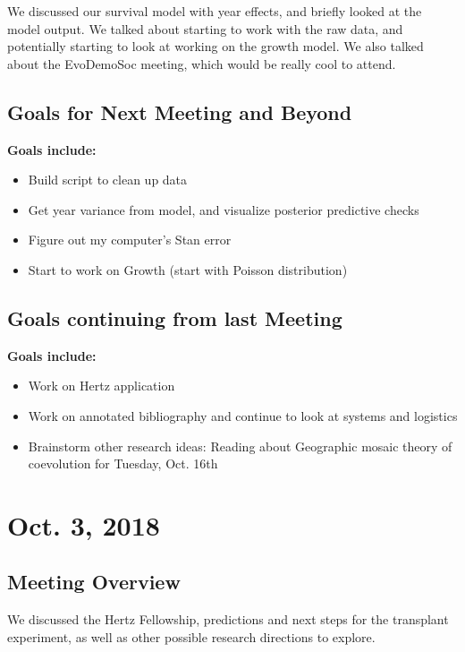 \documentclass{article}
\newcommand{\tom}[1]{{\textit{\color{WildStrawberry}{[#1]}}}}
\begin{document}
We discussed our survival model with year effects, and briefly looked at the model output. We talked about starting to work with the raw data, and potentially starting to look at working on the growth model. We also talked about the EvoDemoSoc meeting, which would be really cool to attend.

\subsection*{Goals for Next Meeting and Beyond}
\textbf{Goals include:} 
\begin{itemize}
\item{Build script to clean up data}
\item{Get year variance from model, and visualize posterior predictive checks}
\item{Figure out my computer's Stan error}
\item{Start to work on Growth (start with Poisson distribution) \tom{When you are ready for it, I can share an example of negative binomial growth modeling in Stan.}}
\end{itemize}

\subsection*{Goals continuing from last Meeting}
\textbf{Goals include:} 
\begin{itemize}
\item{Work on Hertz application}
\item{Work on annotated bibliography and continue to look at systems and logistics \tom{See comment on same point below}}
\item{Brainstorm other research ideas: Reading about Geographic mosaic theory of coevolution for Tuesday, Oct. 16th}
\end{itemize}


\section*{Oct. 3, 2018}
\tom{I made the notes below before pulling some of the more recent meeting notes - sorry. Some of these are not as relevant given your points above.}
\subsection*{Meeting Overview}

We discussed the Hertz Fellowship, predictions and next steps for the transplant experiment, as well as other possible research directions to explore.
\end{document}
